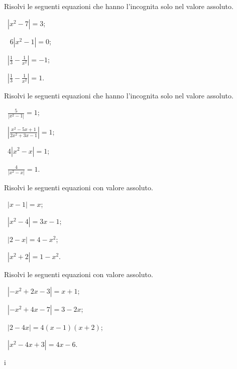 \begin{esercizio}[\Ast]
 \label{ese:7.6}
Risolvi le seguenti equazioni che hanno l'incognita solo nel valore assoluto.
\begin{multicols}{2}
 \begin{enumeratea}
 \item~$\left|x^2-7\right|=3$;
 \item~ $6\left|x^2-1\right|=0$;
 \item~$\left|\frac 1 3-\frac 1{x^2}\right|=-1$;
 \item~$\left|\frac 1 3-\frac 1{x^2}\right|=1$.
 \end{enumeratea}
 \end{multicols}
\end{esercizio}

\begin{esercizio}[\Ast]
 \label{ese:7.7}
Risolvi le seguenti equazioni che hanno l'incognita solo nel valore assoluto.
\begin{multicols}{2}
 \begin{enumeratea}
 \item~$\frac 5{\left|x^2-1\right|}=1$;
 \item~$\left|\frac{x^2-5x+1}{2x^2+3x-1}\right|=1$;
 \item~$4\left|x^2-x\right|=1$;
 \item~$\frac 4{\left|x^2-x\right|}=1$.
 \end{enumeratea}
 \end{multicols}
\end{esercizio}
\newpage
\begin{esercizio}[\Ast]
 \label{ese:7.8}
Risolvi le seguenti equazioni con valore assoluto.
\begin{multicols}{2}
 \begin{enumeratea}
 \item~$\left|x-1\right|=x$;
 \item~$\left|x^2-4\right|=3x-1$;
 \item~$\left|2-x\right|=4-x^2$;
 \item~$\left|x^2+2\right|=1-x^2$.
 \end{enumeratea}
 \end{multicols}
\end{esercizio}

\begin{esercizio}[\Ast]
 \label{ese:7.9}
Risolvi le seguenti equazioni con valore assoluto.
\begin{multicols}{2}
 \begin{enumeratea}
 \item~$\left|-x^2+2x-3\right|=x+1$;
 \item~$\left|-x^2+4x-7\right|=3-2x$;
 \item~$\left|2-4x\right|=4(x-1)(x+2)$;
 \item~$\left|x^2-4x+3\right|=4x-6$.
 \end{enumeratea}
 \end{multicols}
\end{esercizio}i

